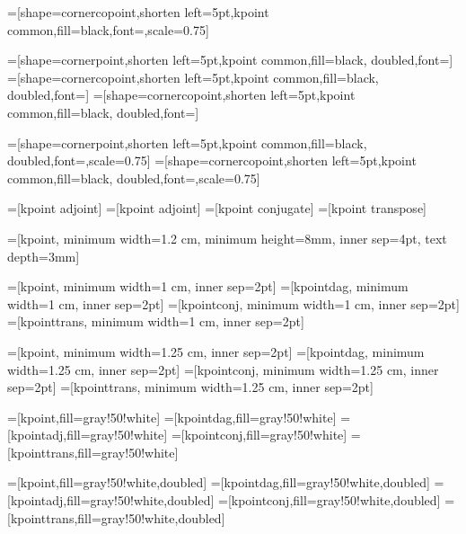 =[shape=cornercopoint,shorten left=5pt,kpoint common,fill=black,font=\color{white},scale=0.75]

=[shape=cornerpoint,shorten left=5pt,kpoint common,fill=black, doubled,font=\color{white}]
=[shape=cornercopoint,shorten left=5pt,kpoint common,fill=black, doubled,font=\color{white}]
=[shape=cornercopoint,shorten left=5pt,kpoint common,fill=black, doubled,font=\color{white}]

=[shape=cornerpoint,shorten left=5pt,kpoint common,fill=black, doubled,font=\color{white},scale=0.75]
=[shape=cornercopoint,shorten left=5pt,kpoint common,fill=black, doubled,font=\color{white},scale=0.75] 

=[kpoint adjoint]
=[kpoint adjoint]
=[kpoint conjugate]
=[kpoint transpose]

=[kpoint, minimum width=1.2 cm, minimum height=8mm, inner sep=4pt, text depth=3mm]

=[kpoint, minimum width=1 cm, inner sep=2pt]%
=[kpointdag, minimum width=1 cm, inner sep=2pt]%
=[kpointconj, minimum width=1 cm, inner sep=2pt]%
=[kpointtrans, minimum width=1 cm, inner sep=2pt]%

=[kpoint, minimum width=1.25 cm, inner sep=2pt]%
=[kpointdag, minimum width=1.25 cm, inner sep=2pt]%
=[kpointconj, minimum width=1.25 cm, inner sep=2pt]%
=[kpointtrans, minimum width=1.25 cm, inner sep=2pt]%

=[kpoint,fill=gray!50!white]
=[kpointdag,fill=gray!50!white]
=[kpointadj,fill=gray!50!white]
=[kpointconj,fill=gray!50!white]
=[kpointtrans,fill=gray!50!white]

=[kpoint,fill=gray!50!white,doubled]
=[kpointdag,fill=gray!50!white,doubled]
=[kpointadj,fill=gray!50!white,doubled]
=[kpointconj,fill=gray!50!white,doubled]
=[kpointtrans,fill=gray!50!white,doubled]


